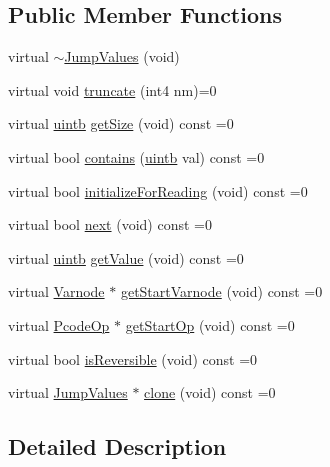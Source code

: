 \subsection*{Public Member Functions}
\begin{DoxyCompactItemize}
\item 
virtual \mbox{\hyperlink{class_jump_values_a690f7467bd51de193ab5f4f82a615296}{$\sim$\+Jump\+Values}} (void)
\item 
virtual void \mbox{\hyperlink{class_jump_values_a8a7cbd3dad9ae70992f122c5da0b43ea}{truncate}} (int4 nm)=0
\item 
virtual \mbox{\hyperlink{types_8h_a2db313c5d32a12b01d26ac9b3bca178f}{uintb}} \mbox{\hyperlink{class_jump_values_abe5edd38ba4e0e00f68e1d5932f338bc}{get\+Size}} (void) const =0
\item 
virtual bool \mbox{\hyperlink{class_jump_values_a870c42f3098324112496fdb03572cf3a}{contains}} (\mbox{\hyperlink{types_8h_a2db313c5d32a12b01d26ac9b3bca178f}{uintb}} val) const =0
\item 
virtual bool \mbox{\hyperlink{class_jump_values_a9de7071bd67d3507636128fe2c537f71}{initialize\+For\+Reading}} (void) const =0
\item 
virtual bool \mbox{\hyperlink{class_jump_values_a2533b15a8ced06d9785f3a20164c1ec8}{next}} (void) const =0
\item 
virtual \mbox{\hyperlink{types_8h_a2db313c5d32a12b01d26ac9b3bca178f}{uintb}} \mbox{\hyperlink{class_jump_values_a152463d975b9364369d2036dafd59303}{get\+Value}} (void) const =0
\item 
virtual \mbox{\hyperlink{class_varnode}{Varnode}} $\ast$ \mbox{\hyperlink{class_jump_values_a6505dbaeb1e61b7d60aff3e9f1947941}{get\+Start\+Varnode}} (void) const =0
\item 
virtual \mbox{\hyperlink{class_pcode_op}{Pcode\+Op}} $\ast$ \mbox{\hyperlink{class_jump_values_a1b1beeebd8a33f7710f30c495f130993}{get\+Start\+Op}} (void) const =0
\item 
virtual bool \mbox{\hyperlink{class_jump_values_a7cd231f94b261ef9a426619cae01d764}{is\+Reversible}} (void) const =0
\item 
virtual \mbox{\hyperlink{class_jump_values}{Jump\+Values}} $\ast$ \mbox{\hyperlink{class_jump_values_adfe4b22f78bedc2e90488a820dd86d3e}{clone}} (void) const =0
\end{DoxyCompactItemize}


\subsection{Detailed Description}


